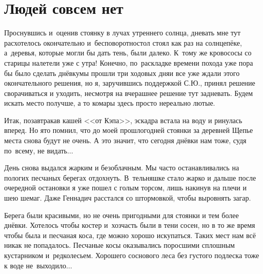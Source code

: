 \chapter{Людей совсем нет} 
\vepsianrose

Проснувшись и~оценив стоянку в лучах утреннего солнца, дневать мне тут расхотелось окончательно и~бесповоротно\mdash стол стоял как раз на солнцепёке, а~деревья, которые могли бы дать тень, были далеко. К~тому же кровососы со старицы налетели уже с утра! Конечно, по~раскладке времени похода уже пора бы было сделать днёвку\mdash мы прошли три ходовых дня\mdash и все уже ждали этого окончательного решения, но я, заручившись поддержкой С.Ю., принял решение сворачиваться и уходить, несмотря на вчерашнее решение тут задневать. Будем искать место получше, а то комары здесь просто нереально лютые.

Итак, позавтракав кашей <<от Кэпа>>, эскадра встала на воду и ринулась вперед. Но я\sdash то помнил, что до моей прошлогодней стоянки за деревней Щепье места снова будут не очень. А это значит, что сегодня днёвки нам тоже, судя по~всему, не видать$\ldots$ 

\newpage
День снова выдался жарким и безоблачным. Мы часто останавливались на пологих песчаных берегах отдохнуть. В~тельняшке стало жарко и дальше после очередной остановки я уже пошел с голым торсом, лишь накинув на плечи и шею шемаг. Даже Геннадич расстался со штормовкой, чтобы выровнять загар. 

Берега были красивыми, но не очень пригодными для стоянки и тем более днёвки. Хотелось чтобы костер и~хозчасть были в тени сосен, но в то же время чтобы была и песчаная коса, где можно хорошо искупаться. Таких мест нам всё никак не попадалось. Песчаные косы оказывались поросшими сплошным кустарником и~редколесьем. Хорошего соснового леса без густого подлеска тоже к воде не~выходило$\ldots$ 

